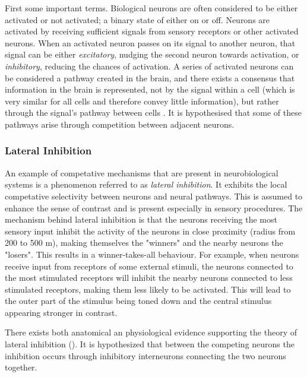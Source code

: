     First some important terms. Biological neurons are often considered to be either activated or not activated; a binary state of either on or off. Neurons are activated by receiving sufficient signals from sensory receptors or other activated neurons. When an activated neuron passes on its signal to another neuron, that signal can be either \textit{excitatory}, nudging the second neuron towards activation, or \textit{inhibitory}, reducing the chances of activation.  A series of activated neurons can be considered a pathway created in the brain, and there exists a consensus that information in the brain is represented, not by the signal within a cell (which is very similar for all cells and therefore convey little information), but rather through the signal's pathway between cells . It is hypothesised that some of these pathways arise through competition between adjacent neurons. 
    
    \subsubsection{Lateral Inhibition}

        An example of competative mechanisms that are present in neurobiological systems is a phenomenon referred to as \textit{lateral inhibition}. It exhibits the local competative selectivity between neurons and neural pathways. This is assumed to enhance the sense of contrast and is present especially in sensory procedures. The mechanism behind lateral inhibition is that the neurons receiving the most sensory input inhibit the activity of the neurons in close proximity (radius from 200 to 500 \textmu m), making themselves the "winners" and the nearby neurons the "losers". This results in a winner-takes-all behaviour. For example, when neurons receive input from receptors of some external stimuli, the neurons connected to the most stimulated receptors will inhibit the nearby neurons connected to less stimulated receptors, making them less likely to be activated. This will lead to the outer part of the stimulus being toned down and the central stimulus appearing stronger in contrast.
        
        There exists both anatomical an physiological evidence supporting the theory of lateral inhibition (). It is hypothesized that between the competing neurons the inhibition occurs through inhibitory interneurons connecting the two neurons together.

